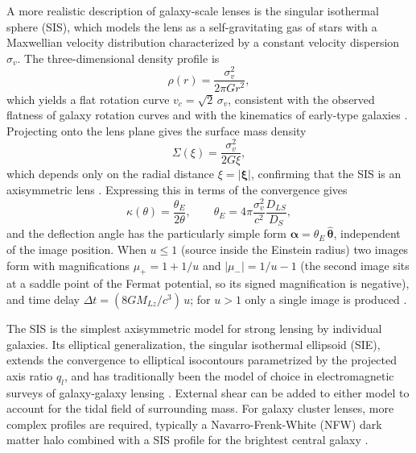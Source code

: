 A more realistic description of galaxy-scale lenses is the 
singular isothermal sphere (SIS), which models the lens as a 
self-gravitating gas of stars with a Maxwellian velocity 
distribution characterized by a constant velocity dispersion 
$\sigma_v$. The three-dimensional density profile is
\begin{equation}
    \rho(r) = \frac{\sigma_v^2}{2\pi G r^2},
\end{equation}
which yields a flat rotation curve $v_c = \sqrt{2}\,\sigma_v$, consistent with the observed flatness of galaxy rotation curves and with the kinematics of early-type galaxies \cite{lensing_regimes}. Projecting onto the lens plane gives the surface mass density
\begin{equation}
    \Sigma(\xi) = \frac{\sigma_v^2}{2G\xi},
\end{equation}
which depends only on the radial distance $\xi = |\boldsymbol{\xi}|$, confirming that the SIS is an axisymmetric lens \cite{amplificationfactor_figure}. Expressing this in terms of the convergence gives
\begin{equation}
    \kappa(\theta) = \frac{\theta_E}{2\theta}, 
    \qquad 
    \theta_E = 4\pi\frac{\sigma_v^2}{c^2}\frac{D_{LS}}{D_S},
    \label{eq:SIS_Einstein}
\end{equation}
and the deflection angle has the particularly simple form 
$\boldsymbol{\alpha} = \theta_E\,\hat{\boldsymbol{\theta}}$, 
independent of the image position. When $u \leq 1$ (source 
inside the Einstein radius) two images form with magnifications $\mu_{+} = 1 + 1/u$ and $|\mu_{-}| = 1/u - 1$ (the second image sits at a saddle point of the Fermat potential, so its signed magnification is negative), and time delay $\Delta t = (8GM_{Lz}/c^3)\,u$; for $u > 1$ only a single image is produced \cite{pointmasslens}. 

The SIS is the simplest axisymmetric model for strong lensing by individual galaxies. Its elliptical generalization, the singular isothermal ellipsoid (SIE), extends the convergence to elliptical isocontours parametrized by the projected axis ratio $q_l$, and has traditionally been the model of choice in electromagnetic surveys of galaxy-galaxy lensing \cite{SIS_standardmodel}. External shear can be added to either model to account for the tidal field of surrounding mass. For galaxy cluster lenses, more complex profiles are required, typically a Navarro-Frenk-White (NFW) dark matter halo combined with a SIS profile for the brightest central galaxy \cite{lensing_regimes}.


